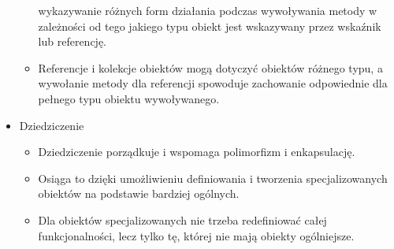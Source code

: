 \documentclass[a4paper]{article}
\begin{document}
\begin{itemize}
\begin{itemize}
        wykazywanie różnych form działania podczas
        wywoływania metody w zależności od tego jakiego
        typu obiekt jest wskazywany przez wskaźnik lub
        referencję.
            \item Referencje i kolekcje obiektów mogą dotyczyć
        obiektów różnego typu, a wywołanie metody dla
        referencji spowoduje zachowanie odpowiednie dla
        pełnego typu obiektu wywoływanego.
        \end{itemize}
        \item Dziedziczenie\\
        \begin{itemize}
            \item Dziedziczenie porządkuje i wspomaga polimorfizm i
            enkapsulację.
            \item Osiąga to dzięki umożliwieniu definiowania i
            tworzenia specjalizowanych obiektów na podstawie
            bardziej ogólnych.
            \item Dla obiektów specjalizowanych nie trzeba
            redefiniować całej funkcjonalności, lecz tylko tę,
            której nie mają obiekty ogólniejsze.
        \end{itemize}
    \end{itemize}
\end{document}
